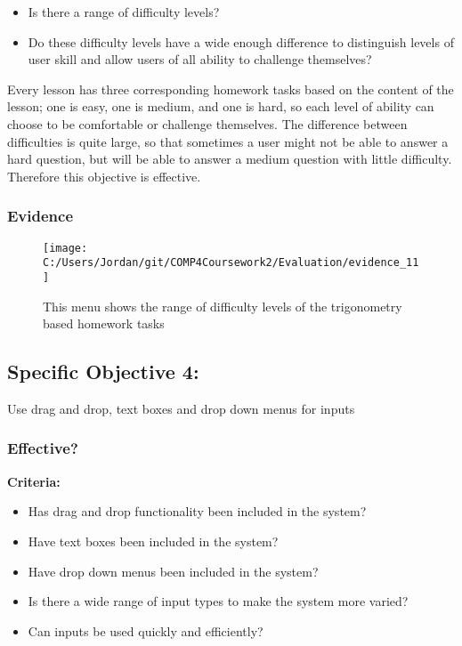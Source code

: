 \begin{itemize}
	\item Is there a range of difficulty levels?
	\item Do these difficulty levels have a wide enough difference to distinguish levels of user skill and allow users of all ability to challenge themselves?
\end{itemize}

Every lesson has three corresponding homework tasks based on the content of the lesson; one is easy, one is medium, and one is hard, so each level of ability can choose to be comfortable or challenge themselves. The difference between difficulties is quite large, so that sometimes a user might not be able to answer a hard question, but will be able to answer a medium question with little difficulty. Therefore this objective is effective.

\subsubsection{Evidence}

\begin{figure}[H]
	\texttt{[image: C:/Users/Jordan/git/COMP4Coursework2/Evaluation/evidence\_11]}
	\caption{This menu shows the range of difficulty levels of the trigonometry based homework tasks}
\end{figure}

\subsection{Specific Objective 4: }

Use drag and drop, text boxes and drop down menus for inputs

\subsubsection{Effective?}

\textbf{Criteria: }

\begin{itemize}
	\item Has drag and drop functionality been included in the system?
	\item Have text boxes been included in the system?
	\item Have drop down menus been included in the system?
	\item Is there a wide range of input types to make the system more varied?
	\item Can inputs be used quickly and efficiently?
\end{itemize}

